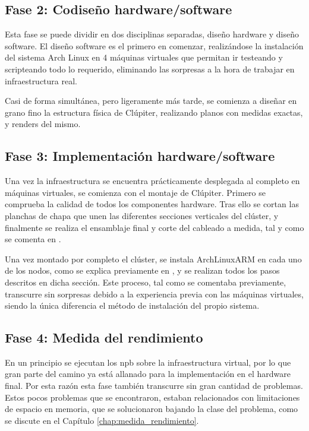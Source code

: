 \subsection{Fase 2: Codiseño hardware/software}
Esta fase se puede dividir en dos disciplinas separadas, diseño hardware y diseño software. El diseño software es el primero en comenzar, realizándose la instalación del sistema Arch Linux en 4 máquinas virtuales que permitan ir testeando y scripteando todo lo requerido, eliminando las sorpresas a la hora de trabajar en infraestructura real.

Casi de forma simultánea, pero ligeramente más tarde, se comienza a diseñar en grano fino la estructura física de Clúpiter, realizando planos con medidas exactas, y renders del mismo.

\subsection{Fase 3: Implementación hardware/software}
Una vez la infraestructura se encuentra prácticamente desplegada al completo en máquinas virtuales, se comienza con el montaje de Clúpiter. Primero se comprueba la calidad de todos los componentes hardware. Tras ello se cortan las planchas de chapa que unen las diferentes secciones verticales del clúster, y finalmente se realiza el ensamblaje final y corte del cableado a medida, tal y como se comenta en .

Una vez montado por completo el clúster, se instala ArchLinuxARM en cada uno de los nodos, como se explica previamente en , y se realizan todos los pasos descritos en dicha sección. Este proceso, tal como se comentaba previamente, transcurre sin sorpresas debido a la experiencia previa con las máquinas virtuales, siendo la única diferencia el método de instalación del propio sistema.

\subsection{Fase 4: Medida del rendimiento}
En un principio se ejecutan los \acrlong{npb} sobre la infraestructura virtual, por lo que gran parte del camino ya está allanado para la implementación en el hardware final. Por esta razón esta fase también transcurre sin gran cantidad de problemas. Estos pocos problemas que se encontraron, estaban relacionados con limitaciones de espacio en memoria, que se solucionaron bajando la clase del problema, como se discute en el Capítulo \ref{chap:medida_rendimiento}.

